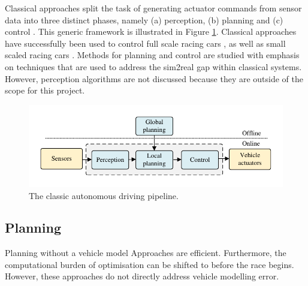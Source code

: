 
Classical approaches split the task of generating actuator commands from sensor data into three distinct phases, namely (a) perception, (b) planning and (c) control \cite{Betz2021}.
This generic framework is illustrated in Figure \ref{fig:full_stack}.
Classical approaches have successfully been used to control full scale racing cars \cite{Valls2018, alvarez2022, Nekkah2020}, as well as small scaled racing cars \cite{Liniger2015}.
Methods for planning and control are studied with emphasis on techniques that are used to address the sim2real gap within classical systems.
However, perception algorithms are not discussed because they are outside of the scope for this project.

\begin{figure}[h]
    \centering
    \includegraphics{contents/chapt2/figs/classic_pipeline.pdf}
    \caption{The classic autonomous driving pipeline.}
    \label{fig:full_stack}
\end{figure}

\subsection{Planning}
\label{sec:trajectory_planning}

Planning without a vehicle model
\cite{DalBianco2019, }
Approaches are efficient.
Furthermore, the computational burden of optimisation can be shifted to before the race begins.
However, these approaches do not directly address vehicle modelling error.







